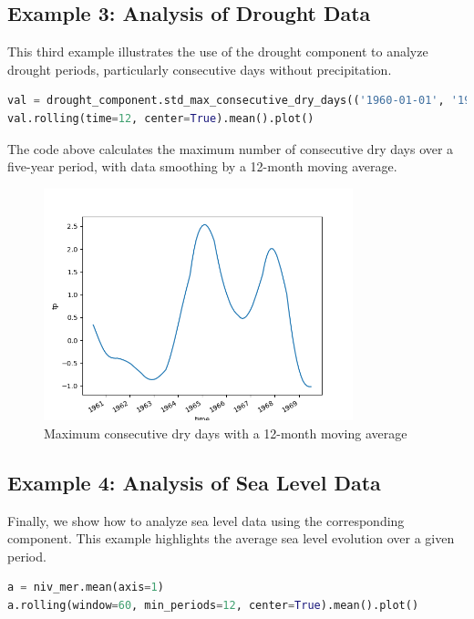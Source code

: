 \documentclass[a4paper,12pt]{article}
\begin{document}
\subsection{Example 3: Analysis of Drought Data}

This third example illustrates the use of the drought component to analyze drought periods, particularly consecutive days without precipitation.

\begin{lstlisting}[language=Python]
val = drought_component.std_max_consecutive_dry_days(('1960-01-01', '1964-12-31'), True)
val.rolling(time=12, center=True).mean().plot()
\end{lstlisting}

The code above calculates the maximum number of consecutive dry days over a five-year period, with data smoothing by a 12-month moving average.

\begin{figure}[htbp]
\centering
\includegraphics[width=0.8\textwidth]{drought_example.png}
\caption{Maximum consecutive dry days with a 12-month moving average}
\end{figure}

\subsection{Example 4: Analysis of Sea Level Data}

Finally, we show how to analyze sea level data using the corresponding component. This example highlights the average sea level evolution over a given period.

\begin{lstlisting}[language=Python]
a = niv_mer.mean(axis=1)
a.rolling(window=60, min_periods=12, center=True).mean().plot()
\end{lstlisting}
\end{document}

